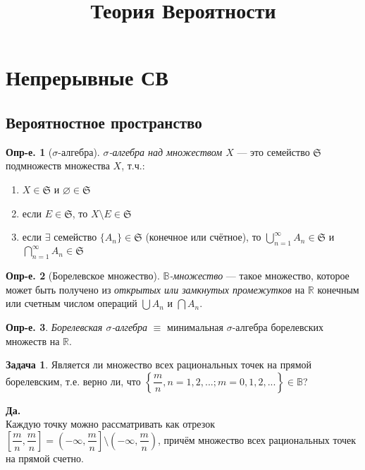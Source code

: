 \documentclass[a4paper,12pt]{article}
\title{Теория Вероятности}
\author{}
\date{}
\numberwithin{figure}{section}
\theoremstyle{definition}
\newtheorem{definition}{Опр-е.}[section]
\newtheorem{problem}{Задача}[section]
\let\DS\displaystyle
\def\BB{\mathbb{B}}
\def\RR{\mathbb{R}}
\def\SS{\mathfrak{S}}
\def\mbyn{\dfrac{m}{n}}
\begin{document}
\maketitle


\section{Непрерывные СВ}


\subsection{Вероятностное пространство}

\begin{definition}[$\sigma$-алгебра]
\textit{$\sigma$-алгебра над множеством $X$}
--- это семейство $\SS$ подмножеств множества $X$, т.ч.:
\begin{enumerate}
	\item $X \in \SS$ и $\varnothing \in \SS$
	\item если $E \in \SS$, то $X \setminus E \in \SS$
	\item если $\exists$ семейство $\{A_n\} \in \SS$ (конечное или счётное),
	      то $\DS \bigcup_{n=1}^{\infty} A_n \in \SS$
	      и $\DS \bigcap_{n=1}^{\infty} A_n \in \SS$
\end{enumerate}
\end{definition}

\begin{definition}[Борелевское множество]
	\textit{$\BB$-множество} --- такое множество, которое может быть
	получено из \textit{открытых или замкнутых промежутков} на $\RR$
	конечным или счетным числом операций $\bigcup A_n$ и $\bigcap A_n$.
\end{definition}

\begin{definition}
	\textit{Борелевская $\sigma$-алгебра} $\equiv$ минимальная
	$\sigma$-алгебра борелевских множеств на $\RR$.
\end{definition}


\medskip
\begin{problem}
	Является ли множество всех рациональных точек на прямой борелевским,
	т.е. верно ли, что
	$\left\{ \mbyn, n=1,2,...; m=0,1,2,... \right\} \in \BB$?
\end{problem}
\begin{solution}
	{\bfseries Да.}\\
	Каждую точку можно рассматривать как отрезок
	$\left[ \mbyn,\mbyn \right] =
	\left( -\infty, \mbyn \right] \setminus \left( -\infty, \mbyn \right)$,
	причём множество всех рациональных точек на прямой счетно.
\end{solution}
\end{document}

